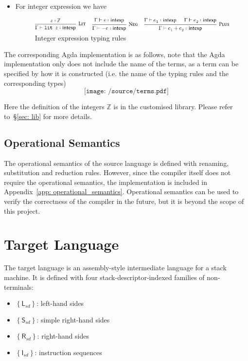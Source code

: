 \documentclass[12pt,a4paper]{report}
\theoremstyle{definition}
\newcommand{\secref}[1]{\S\ref{#1}}
\newcommand{\bZ}{\mathbb{Z}}
\newcommand{\bracket}[1]{\left\{ #1 \right\}}
\begin{document}
\begin{itemize}
\begin{figure}[H]
                    \label{fig: rule_comm}
                \end{figure}
            \item For integer expression we have
                \begin{figure}[H]
                    \centering
                    \includegraphics{source_terms_intexp.pdf}
                    \caption{Integer expression typing rules}
                    \label{fig: rule_intexp}
                \end{figure}
        \end{itemize}

        The corresponding Agda implementation is as follows, note that the Agda implementation only does not include the name of the terms, as a term can be specified by how it is constructed (i.e. the name of the typing rules and the corresponding types)
        \[\texttt{[image: /source/terms.pdf]}\]

        Here the definition of the integers $\bZ$ is in the customised library. Please refer to~\secref{sec: lib} for more details.

        \subsection{Operational Semantics}
        The operational semantics of the source language is defined with renaming, substitution and reduction rules. However, since the compiler itself does not require the operational semantics, the implementation is included in Appendix~\ref{app: operational_semantics}. Operational semantics can be used to verify the correctness of the compiler in the future, but it is beyond the scope of this project.


    \section{Target Language}
    The target language is an assembly-style intermediate language for a stack machine. It is defined with four stack-descriptor-indexed families of non-terminals: 
    \begin{itemize}
        \item 
            $\bracket{\textsf{L}_{sd}}$: left-hand sides
        \item 
            $\bracket{\textsf{S}_{sd}}$: simple right-hand sides
        \item
            $\bracket{\textsf{R}_{sd}}$: right-hand sides
        \item
            $\bracket{\textsf{I}_{sd}}$: instruction sequences
    \end{itemize}
\end{document}
